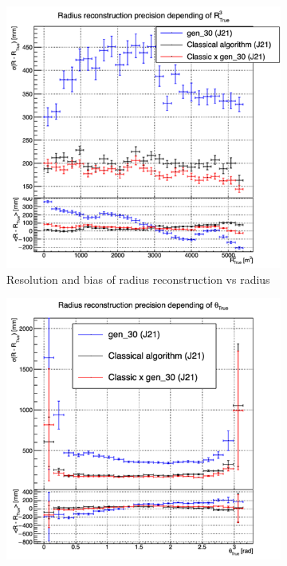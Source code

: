\documentclass[../main.tex]{subfiles}
\begin{document}
\begin{figure}[ht]
  \begin{subfigure}[t]{0.32\linewidth}
    \centering
    \includegraphics[width=\linewidth]{images/jcnn/vic_cnn/multi_vic_cnn_Cx30_MSBvRTC.png}
    \caption{Resolution and bias of radius reconstruction vs radius}
    \label{fig:jcnn:vic_cnn:multi_vic_cnn_Cx30_MSBvRTC}
  \end{subfigure}
  \begin{subfigure}[t]{0.32\linewidth}
    \centering
    \includegraphics[width=\linewidth]{images/jcnn/vic_cnn/multi_vic_cnn_Cx30_MSBvTTC.png}

\end{subfigure}
\end{figure}
\end{document}
